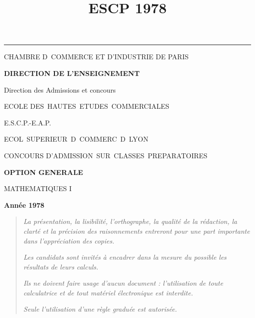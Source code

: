 \documentclass[11pt]{article}%
\title{\bf \vspace{-2cm} ESCP 1978} %
\author{} %
\date{} %
\begin{document}
\maketitle %
\vspace{-1.4cm}\hrule %
\thispagestyle{fancy}

\vspace*{.2cm}




\begin{center}
{\small CHAMBRE D\E\ COMMERCE ET D'INDUSTRIE DE PARIS}

\textbf{DIRECTION DE L'ENSEIGNEMENT}

Direction des Admissions et concours

\underline{\hspace*{3cm}}

{\Large ECOLE DES\ HAUTES\ ETUDES\ COMMERCIALES}

{\Large E.S.C.P.-E.A.P.}

{\Large ECOL\E\ SUPERIEUR\E\ D\E\ COMMERC\E\ D\E\ LYON}{\large }

CONCOURS D'ADMISSION\ SUR\ CLASSES\ PREPARATOIRES

\underline{\hspace*{3cm}}

\textbf{OPTION GENERALE}

{\Large MATHEMATIQUES I}

\textbf{Année 1978}

\underline{\hspace*{3cm}}
\end{center}

\begin{quotation}
\noindent \textsl{La présentation, la lisibilité, l'orthographe, la
qualité
de la rédaction, la clarté et la précision des raisonnements entreront
pour
une part importante dans l'appréciation des copies.}

\noindent \textsl{Les candidats sont invités à encadrer dans la mesure
du
possible les résultats de leurs calculs.}

\noindent \textsl{Ils ne doivent faire usage d'aucun document :
l'utilisation de toute calculatrice et de tout matériel électronique
est
interdite.}

\noindent \textsl{Seule l'utilisation d'une règle graduée est
autorisée.}

\noindent \textsl{\hrulefill }
\end{quotation}
\end{document}
